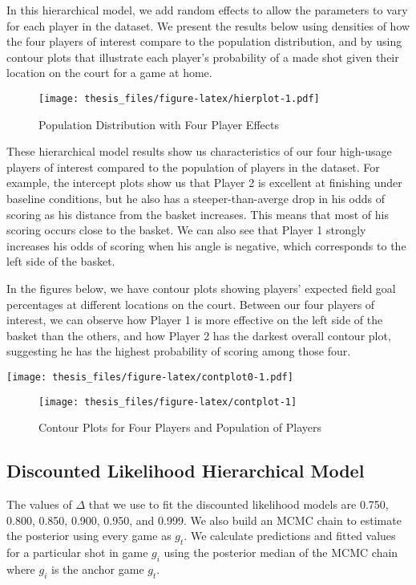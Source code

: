 \documentclass[12pt,twoside]{dukestatscithesis}
\theoremstyle{definition}
\theoremstyle{definition}
\theoremstyle{definition}
\theoremstyle{remark}
\begin{document}
In this hierarchical model, we add random effects to allow the
parameters to vary for each player in the dataset. We present the
results below using densities of how the four players of interest
compare to the population distribution, and by using contour plots that
illustrate each player's probability of a made shot given their location
on the court for a game at home.
\begin{figure}[htbp]
\centering
\texttt{[image: thesis\_files/figure-latex/hierplot-1.pdf]}
\caption{\label{fig:hierplot}Population Distribution with Four Player
Effects}
\end{figure}
These hierarchical model results show us characteristics of our four
high-usage players of interest compared to the population of players in
the dataset. For example, the intercept plots show us that Player 2 is
excellent at finishing under baseline conditions, but he also has a
steeper-than-averge drop in his odds of scoring as his distance from the
basket increases. This means that most of his scoring occurs close to
the basket. We can also see that Player 1 strongly increases his odds of
scoring when his angle is negative, which corresponds to the left side
of the basket.

In the figures below, we have contour plots showing players' expected
field goal percentages at different locations on the court. Between our
four players of interest, we can observe how Player 1 is more effective
on the left side of the basket than the others, and how Player 2 has the
darkest overall contour plot, suggesting he has the highest probability
of scoring among those four.

\texttt{[image: thesis\_files/figure-latex/contplot0-1.pdf]}
\begin{figure}

\hfill{}\texttt{[image: thesis\_files/figure-latex/contplot-1]} 

\caption{Contour Plots for Four Players and Population of Players}\label{fig:contplot}
\end{figure}
\subsection{Discounted Likelihood Hierarchical
Model}\label{discounted-likelihood-hierarchical-model-1}

The values of \(\Delta\) that we use to fit the discounted likelihood
models are 0.750, 0.800, 0.850, 0.900, 0.950, and 0.999. We also build
an MCMC chain to estimate the posterior using every game as \(g_t\). We
calculate predictions and fitted values for a particular shot in game
\(g_i\) using the posterior median of the MCMC chain where \(g_i\) is
the anchor game \(g_t\).
\end{document}
